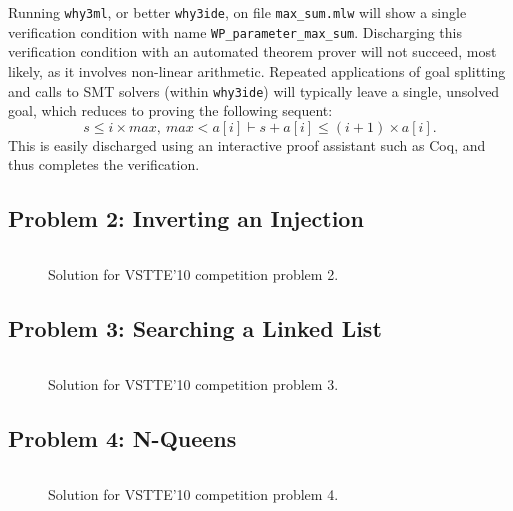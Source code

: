 Running \texttt{why3ml}, or better \texttt{why3ide}, on file
\verb|max_sum.mlw| will show a single verification condition with name
\verb|WP_parameter_max_sum|.
Discharging this verification condition with an automated theorem
prover will not succeed, most likely, as it involves non-linear
arithmetic. Repeated applications of goal splitting and calls to
SMT solvers (within \texttt{why3ide}) will typically leave a single,
unsolved goal, which reduces to proving the following sequent:
\begin{displaymath}
  s \le i \times max, ~ max < a[i] \vdash s + a[i] \le (i+1) \times a[i].
\end{displaymath}
This is easily discharged using an interactive proof assistant such as
Coq, and thus completes the verification.

\subsection{Problem 2: Inverting an Injection}

\begin{figure}
  \centering
\begin{verbatim}
\end{verbatim}
\hrulefill
  \caption{Solution for VSTTE'10 competition problem 2.}
  \label{fig:Inverting}
\end{figure}

\subsection{Problem 3: Searching a Linked List}

\begin{figure}
  \centering
\begin{verbatim}
\end{verbatim}
\hrulefill
  \caption{Solution for VSTTE'10 competition problem 3.}
  \label{fig:LinkedList}
\end{figure}

\subsection{Problem 4: N-Queens}

\begin{figure}
  \centering
\begin{verbatim}
\end{verbatim}
\hrulefill
  \caption{Solution for VSTTE'10 competition problem 4.}
  \label{fig:NQueens}
\end{figure}

